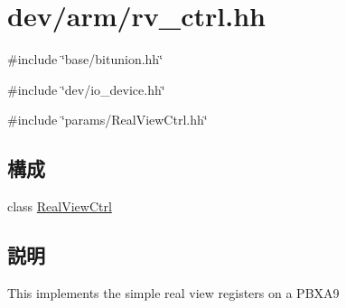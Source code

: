 \hypertarget{rv__ctrl_8hh}{
\section{dev/arm/rv\_\-ctrl.hh}
\label{rv__ctrl_8hh}
}
{\ttfamily \#include \char`\"{}base/bitunion.hh\char`\"{}}\par
{\ttfamily \#include \char`\"{}dev/io\_\-device.hh\char`\"{}}\par
{\ttfamily \#include \char`\"{}params/RealViewCtrl.hh\char`\"{}}\par
\subsection*{構成}
\begin{DoxyCompactItemize}
\item 
class \hyperlink{classRealViewCtrl}{RealViewCtrl}
\end{DoxyCompactItemize}


\subsection{説明}
This implements the simple real view registers on a PBXA9 